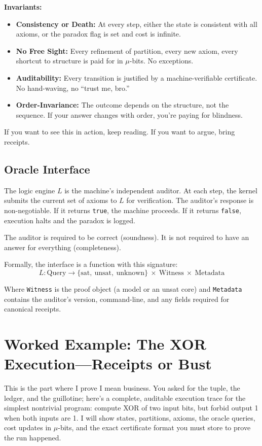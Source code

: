 \documentclass[11pt]{article}
\begin{document}
\textbf{Invariants:}
\begin{itemize}
  \item \textbf{Consistency or Death:} At every step, either the state is consistent with all axioms, or the paradox flag is set and cost is infinite.
  \item \textbf{No Free Sight:} Every refinement of partition, every new axiom, every shortcut to structure is paid for in $\mu$-bits. No exceptions.
  \item \textbf{Auditability:} Every transition is justified by a machine-verifiable certificate. No hand-waving, no “trust me, bro.”
  \item \textbf{Order-Invariance:} The outcome depends on the structure, not the sequence. If your answer changes with order, you’re paying for blindness.
\end{itemize}

If you want to see this in action, keep reading. If you want to argue, bring receipts.

\subsection{Oracle Interface}
The logic engine $L$ is the machine's independent auditor. At each step, the kernel submits the current set of axioms to $L$ for verification. The auditor's response is non-negotiable. If it returns \texttt{true}, the machine proceeds. If it returns \texttt{false}, execution halts and the paradox is logged.

The auditor is required to be correct (soundness). It is not required to have an answer for everything (completeness).

Formally, the interface is a function with this signature:
$$
L : \mathrm{Query} \to \{\mathrm{sat},\ \mathrm{unsat},\ \mathrm{unknown}\}\ \times\ \mathrm{Witness}\ \times\ \mathrm{Metadata}
$$

Where \texttt{Witness} is the proof object (a model or an unsat core) and \texttt{Metadata} contains the auditor's version, command-line, and any fields required for canonical receipts.

\section{Worked Example: The XOR Execution—Receipts or Bust}
This is the part where I prove I mean business. You asked for the tuple, the ledger, and the guillotine; here’s a complete, auditable execution trace for the simplest nontrivial program: compute XOR of two input bits, but forbid output 1 when both inputs are 1. I will show states, partitions, axioms, the oracle queries, cost updates in $\mu$-bits, and the exact certificate format you must store to prove the run happened.
\end{document}
